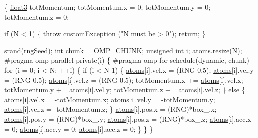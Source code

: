 \begin{DoxyCode}
                                                                 \{
    \hyperlink{structfloat3}{float3} totMomentum;
    totMomentum.x = 0; totMomentum.y = 0; totMomentum.z = 0;

    \textcolor{keywordflow}{if} (N < 1) \{
        \textcolor{keywordflow}{throw} \hyperlink{classcustom_exception}{customException} (\textcolor{stringliteral}{"N must be > 0"});
        \textcolor{keywordflow}{return};
    \}

    srand(rngSeed);
    \textcolor{keywordtype}{int} chunk = OMP\_CHUNK;
    \textcolor{keywordtype}{unsigned} \textcolor{keywordtype}{int} i;
    \hyperlink{classsystem_definition_ae8814d3f60fc1111af2a3f218a4bfcab}{atoms}.resize(N);
\textcolor{preprocessor}{    #pragma omp parallel private(i)}
\textcolor{preprocessor}{}    \{
\textcolor{preprocessor}{    #pragma omp for schedule(dynamic, chunk)}
\textcolor{preprocessor}{}    \textcolor{keywordflow}{for} (i = 0; i < N; ++i) \{
        \textcolor{keywordflow}{if} (i < N-1) \{
            \hyperlink{classsystem_definition_ae8814d3f60fc1111af2a3f218a4bfcab}{atoms}[i].vel.x = (RNG-0.5);
            \hyperlink{classsystem_definition_ae8814d3f60fc1111af2a3f218a4bfcab}{atoms}[i].vel.y = (RNG-0.5);
            \hyperlink{classsystem_definition_ae8814d3f60fc1111af2a3f218a4bfcab}{atoms}[i].vel.z = (RNG-0.5);
            totMomentum.x += \hyperlink{classsystem_definition_ae8814d3f60fc1111af2a3f218a4bfcab}{atoms}[i].vel.x;
            totMomentum.y += \hyperlink{classsystem_definition_ae8814d3f60fc1111af2a3f218a4bfcab}{atoms}[i].vel.y;
            totMomentum.z += \hyperlink{classsystem_definition_ae8814d3f60fc1111af2a3f218a4bfcab}{atoms}[i].vel.z;
        \} \textcolor{keywordflow}{else} \{
            \hyperlink{classsystem_definition_ae8814d3f60fc1111af2a3f218a4bfcab}{atoms}[i].vel.x = -totMomentum.x;
            \hyperlink{classsystem_definition_ae8814d3f60fc1111af2a3f218a4bfcab}{atoms}[i].vel.y = -totMomentum.y;
            \hyperlink{classsystem_definition_ae8814d3f60fc1111af2a3f218a4bfcab}{atoms}[i].vel.z = -totMomentum.z;
        \}
        \hyperlink{classsystem_definition_ae8814d3f60fc1111af2a3f218a4bfcab}{atoms}[i].pos.x = (RNG)*box\_.x;
        \hyperlink{classsystem_definition_ae8814d3f60fc1111af2a3f218a4bfcab}{atoms}[i].pos.y = (RNG)*box\_.y;
        \hyperlink{classsystem_definition_ae8814d3f60fc1111af2a3f218a4bfcab}{atoms}[i].pos.z = (RNG)*box\_.z;
        \hyperlink{classsystem_definition_ae8814d3f60fc1111af2a3f218a4bfcab}{atoms}[i].acc.x = 0;
        \hyperlink{classsystem_definition_ae8814d3f60fc1111af2a3f218a4bfcab}{atoms}[i].acc.y = 0;
        \hyperlink{classsystem_definition_ae8814d3f60fc1111af2a3f218a4bfcab}{atoms}[i].acc.z = 0;
    \}
    \}
\}
\end{DoxyCode}

